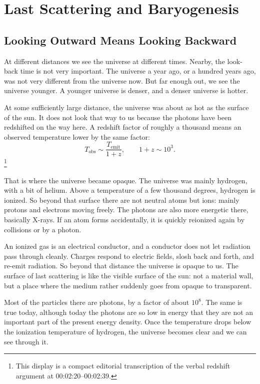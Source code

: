 \chapter{Last Scattering and Baryogenesis}

\section{Looking Outward Means Looking Backward}

At different distances we see the universe at different times. Nearby, the look-back time is not very important. The universe a year ago, or a hundred years ago, was not very different from the universe now. But far enough out, we see the universe younger. A younger universe is denser, and a denser universe is hotter.

At some sufficiently large distance, the universe was about as hot as the surface of the sun. It does not look that way to us because the photons have been redshifted on the way here. A redshift factor of roughly a thousand means an observed temperature lower by the same factor:
\[
T_{\mathrm{obs}} \sim \frac{T_{\mathrm{emit}}}{1+z},
\qquad
1+z \sim 10^3.
\]\footnote{This display is a compact editorial transcription of the verbal redshift argument at 00:02:20--00:02:39.}

That is where the universe became opaque. The universe was mainly hydrogen, with a bit of helium. Above a temperature of a few thousand degrees, hydrogen is ionized. So beyond that surface there are not neutral atoms but ions: mainly protons and electrons moving freely. The photons are also more energetic there, basically X-rays. If an atom forms accidentally, it is quickly reionized again by collisions or by a photon.

An ionized gas is an electrical conductor, and a conductor does not let radiation pass through cleanly. Charges respond to electric fields, slosh back and forth, and re-emit radiation. So beyond that distance the universe is opaque to us. The surface of last scattering is like the visible surface of the sun: not a material wall, but a place where the medium rather suddenly goes from opaque to transparent.

Most of the particles there are photons, by a factor of about \(10^8\). The same is true today, although today the photons are so low in energy that they are not an important part of the present energy density. Once the temperature drops below the ionization temperature of hydrogen, the universe becomes clear and we can see through it.

